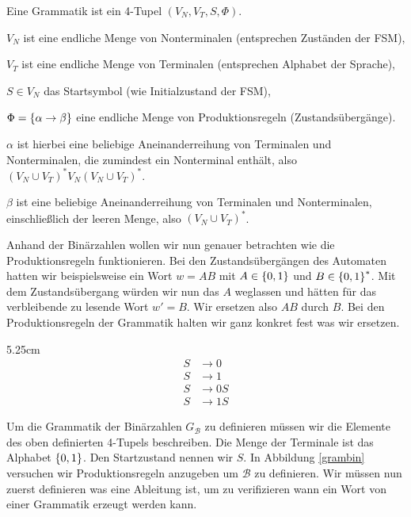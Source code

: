 \begin{defn}[Grammatik]
Eine Grammatik ist ein 4-Tupel $(V_N, V_T, S, \Phi)$.
\begin{\whichitem}
\item $V_N$ ist eine endliche Menge von Nonterminalen (entsprechen Zuständen der FSM),
\item $V_T$ ist eine endliche Menge von Terminalen (entsprechen Alphabet der Sprache),
\item $S \in V_N$ das Startsymbol (wie Initialzustand der FSM),
\item $\Phi=\left\{\alpha \to \beta\right\}$ eine endliche Menge von Produktionsregeln (Zustandsübergänge).

$\alpha$ ist hierbei eine beliebige Aneinanderreihung von Terminalen und Nonterminalen, die zumindest ein Nonterminal enthält,
also $(V_N \cup V_T)^* V_N (V_N \cup V_T)^*$.

$\beta$ ist eine beliebige Aneinanderreihung von Terminalen und Nonterminalen, einschließlich der leeren Menge,
also $(V_N \cup V_T)^*$.
\end{\whichitem}
\end{defn}

Anhand der Binärzahlen wollen wir nun genauer betrachten wie die Produktionsregeln funktionieren.
Bei den Zustandsübergängen des Automaten hatten wir beispielsweise ein Wort $w=AB$ mit $A \in \left\{0,1\right\}$ und $B \in \left\{0,1\right\}^*$.
Mit dem Zustandsübergang würden wir nun das $A$ weglassen und hätten für das verbleibende zu lesende Wort $w'=B$.
Wir ersetzen also $AB$ durch $B$. Bei den Produktionsregeln der Grammatik halten wir ganz konkret fest was wir ersetzen.

\begin{floatingfigure}[r]{5.25cm}
\vspace{-0.5cm}
\begin{align*}
S &\to 0 \\
S &\to 1 \\
S &\to 0S \\
S &\to 1S
\end{align*}
 \caption{Binärzahl Grammatik}
 \label{grambin}
\end{floatingfigure}

Um die Grammatik der Binärzahlen $G_{\mathcal{B}}$ zu definieren müssen wir die Elemente des oben definierten 4-Tupels beschreiben.
Die Menge der Terminale ist das Alphabet $\left\{0,1\right\}$.
Den Startzustand nennen wir $S$. In Abbildung \ref{grambin} versuchen wir Produktionsregeln anzugeben um $\mathcal{B}$ zu definieren.
Wir müssen nun zuerst definieren was eine Ableitung ist, um zu verifizieren wann ein Wort von einer Grammatik erzeugt werden kann.

